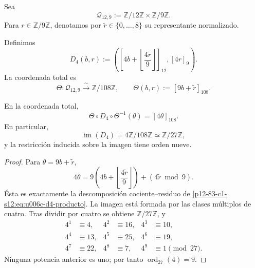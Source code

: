 Sea
\[
 \mathcal Q_{12,9}:=
 \mathbb Z/12\mathbb Z\times\mathbb Z/9\mathbb Z.
\]
Para \(r\in\mathbb Z/9\mathbb Z\), denotamos por
\(\widetilde r\in\{0,\ldots,8\}\) su representante normalizado.

\begin{definition}
\label{p12-83-c1-s12:def:u006c-dilatacion-registro}
Definimos
\begin{equation}
 D_4(b,r):=
 \left(
 \left[
  4b+\left\lfloor\frac{4\widetilde r}{9}\right\rfloor
 \right]_{12},
 [4r]_9
 \right).
 \label{p12-83-c1-s12:eq:u006c-d4-producto}
\end{equation}
La coordenada total es
\begin{equation}
 \Theta:\mathcal Q_{12,9}\xrightarrow{\;\sim\;}
 \mathbb Z/108\mathbb Z,
 \qquad
 \Theta(b,r):=[9b+\widetilde r]_{108}.
 \label{p12-83-c1-s12:eq:u006c-coordenada-total}
\end{equation}
\end{definition}

\begin{proposition}
\label{p12-83-c1-s12:prop:u006c-d4-total}
En la coordenada total,
\begin{equation}
 \boxed{
 \Theta\circ D_4\circ\Theta^{-1}(\theta)=[4\theta]_{108}.}
 \label{p12-83-c1-s12:eq:u006c-d4-total}
\end{equation}
En particular,
\begin{equation}
 \operatorname{im}(D_4)
 =4\mathbb Z/108\mathbb Z
 \simeq\mathbb Z/27\mathbb Z,
 \label{p12-83-c1-s12:eq:u006c-imagen-d4}
\end{equation}
y la restricción inducida sobre la imagen tiene orden nueve.
\end{proposition}

\begin{proof}
Para \(\theta=9b+\widetilde r\),
\[
 4\theta
 =9\left(
  4b+\left\lfloor\frac{4\widetilde r}{9}\right\rfloor
 \right)
 +(4\widetilde r\bmod9).
\]
Ésta es exactamente la descomposición cociente--residuo de
\eqref{p12-83-c1-s12:eq:u006c-d4-producto}. La imagen está formada por las clases
múltiplos de cuatro. Tras dividir por cuatro se obtiene
\(\mathbb Z/27\mathbb Z\), y
\[
\begin{aligned}
 4^1&\equiv4,& 4^2&\equiv16,& 4^3&\equiv10,\\
 4^4&\equiv13,& 4^5&\equiv25,& 4^6&\equiv19,\\
 4^7&\equiv22,& 4^8&\equiv7,& 4^9&\equiv1\pmod{27}.
\end{aligned}
\]
Ninguna potencia anterior es uno; por tanto
\(\operatorname{ord}_{27}(4)=9\).
\end{proof}

